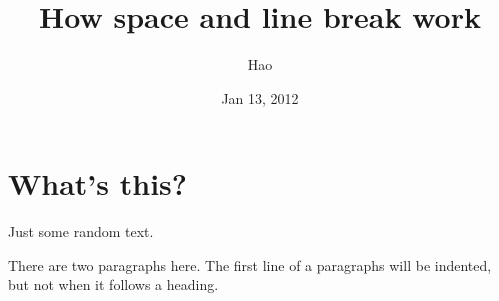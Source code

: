\documentclass[a4paper,10pt]{article}
\title{How space and line break work}
\author{Hao}
\date{Jan 13, 2012}
\begin{document}
\maketitle

\begin{abstract}

\end{abstract}

\section{What's this?}
Just   some    random
text.

There are two paragraphs here. 
The first line of a paragraphs will be indented, but not when it follows a heading.
\end{document}
